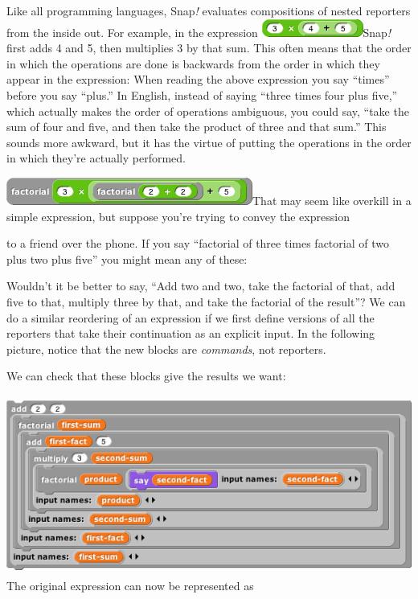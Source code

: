 Like all programming languages, Snap\emph{!} evaluates compositions of
nested reporters from the inside out. For example, in the expression
\includegraphics[width=1.3125in,height=0.22917in]{media/image884.png}Snap\emph{!}
first adds 4 and 5, then multiplies 3 by that sum. This often means that
the order in which the operations are done is backwards from the order
in which they appear in the expression: When reading the above
expression you say ``times'' before you say ``plus.'' In English,
instead of saying ``three times four plus five,'' which actually makes
the order of operations ambiguous, you could say, ``take the sum of four
and five, and then take the product of three and that sum.'' This sounds
more awkward, but it has the virtue of putting the operations in the
order in which they're actually performed.

\includegraphics[width=3.1875in,height=0.35417in]{media/image885.png}That
may seem like overkill in a simple expression, but suppose you're trying
to convey the expression

to a friend over the phone. If you say ``factorial of three times
factorial of two plus two plus five'' you might mean any of these:

Wouldn't it be better to say, ``Add two and two, take the factorial of
that, add five to that, multiply three by that, and take the factorial
of the result''? We can do a similar reordering of an expression if we
first define versions of all the reporters that take their continuation
as an explicit input. In the following picture, notice that the new
blocks are \emph{commands}, not reporters.

We can check that these blocks give the results we want:

\includegraphics[width=5.53333in,height=2.31806in]{media/image908.png}The
original expression can now be represented as

